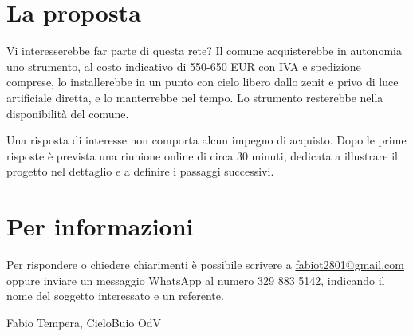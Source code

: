 \documentclass[11pt,a4paper]{report}
\begin{document}
\section*{La proposta}

Vi interesserebbe far parte di questa rete? Il comune acquisterebbe in autonomia uno strumento, al costo indicativo di 550-650 EUR con IVA e spedizione comprese, lo installerebbe in un punto con cielo libero dallo zenit e privo di luce artificiale diretta, e lo manterrebbe nel tempo. Lo strumento resterebbe nella disponibilità del comune.

Una risposta di interesse non comporta alcun impegno di acquisto. Dopo le prime risposte è prevista una riunione online di circa 30 minuti, dedicata a illustrare il progetto nel dettaglio e a definire i passaggi successivi.

\section*{Per informazioni}

Per rispondere o chiedere chiarimenti è possibile scrivere a \url{fabiot2801@gmail.com} oppure inviare un messaggio WhatsApp al numero 329 883 5142, indicando il nome del soggetto interessato e un referente.

\vspace{0.6cm}

\noindent Fabio Tempera, CieloBuio OdV
\end{document}
